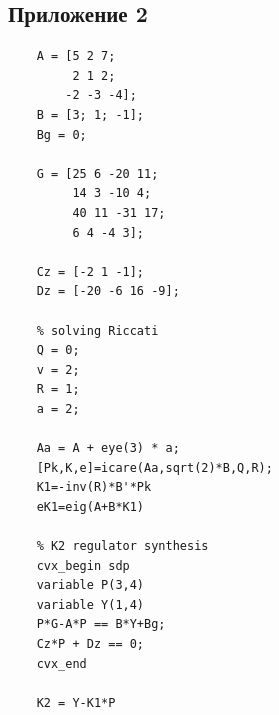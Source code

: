 \documentclass[a4paper, 12pt]{article}
\begin{document}
    \subsection{Приложение 2}
    \begin{lstlisting}[label=task2, caption={Программа для задания 2}]
    % plant parameters
    A = [5 2 7;
         2 1 2;
        -2 -3 -4];
    B = [3; 1; -1];
    Bg = 0;

    G = [25 6 -20 11;
         14 3 -10 4;
         40 11 -31 17;
         6 4 -4 3];

    Cz = [-2 1 -1];
    Dz = [-20 -6 16 -9];

    % solving Riccati
    Q = 0;
    v = 2;
    R = 1;
    a = 2;

    Aa = A + eye(3) * a;
    [Pk,K,e]=icare(Aa,sqrt(2)*B,Q,R);
    K1=-inv(R)*B'*Pk
    eK1=eig(A+B*K1)

    % K2 regulator synthesis
    cvx_begin sdp
    variable P(3,4)
    variable Y(1,4)
    P*G-A*P == B*Y+Bg;
    Cz*P + Dz == 0;
    cvx_end

    K2 = Y-K1*P
    \end{lstlisting}
\end{document}
